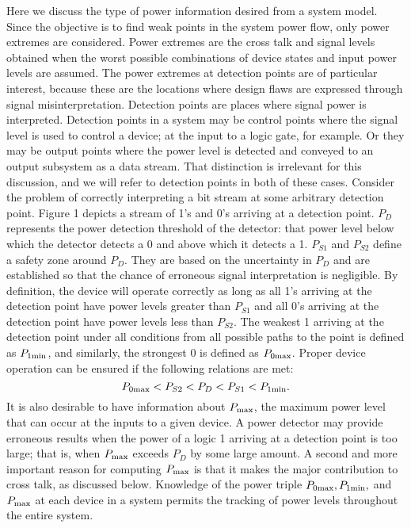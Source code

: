 Here we discuss the type of power information desired from a system model.
Since the objective is to find weak points in the system power flow, only
power extremes are considered.  Power extremes are the cross talk and
signal levels obtained when the worst possible combinations of device
states and input power levels are assumed.  The power extremes at detection
points are of particular interest, because these are the locations where
design flaws are expressed through signal misinterpretation.  Detection
points are places where signal power is interpreted.  Detection points in a
system may be control points where the signal level is used to control a
device; at the input to a logic gate, for example.  Or they may be output
points where the power level is detected and conveyed to an output
subsystem as a data stream.  That distinction is irrelevant for this
discussion, and we will refer to detection points in both of these cases.
Consider the problem of correctly interpreting a bit stream at some
arbitrary detection point.  Figure 1 depicts a stream of 1's and 0's
arriving at a detection point.  $ P_D $ represents the power detection
threshold of the detector: that power level below which the detector
detects a 0 and above which it detects a 1.  $ P_{S1} $ and $ P_{S2} $
define a safety zone around $ P_D$.  They are based on the uncertainty in $
P_D$ and are established so that the chance of erroneous signal
interpretation is negligible.  By definition, the device will operate
correctly as long as all 1's arriving at the detection point have power
levels greater than $ P_{S1}$ and all 0's arriving at the detection point
have power levels less than $ P_{S2}$.  The weakest 1 arriving at the
detection point under all conditions from all possible paths to the point
is defined as $P_{1\rm min}$, and similarly, the strongest 0 is defined as
$ P_{0\rm max}$.  Proper device operation can be ensured if the following
relations are met:
\begin{equation} P_{0\rm max} < P_{S2} < P_{D} < P_{S1} < P_{1\rm
min}.\label{p0}
\end{equation}
It is also desirable to have information about $ P_{\rm max} $, the maximum
power level that can occur at the inputs to a given device.  A power
detector may provide erroneous results when the power of a logic 1 arriving
at a detection point is too large; that is, when $ P_{\rm max} $ exceeds $
P_D $ by some large amount.  A second and more important reason for
computing $ P_{\rm max} $ is that it makes the major contribution to cross
talk, as discussed below.  Knowledge of the power triple $ P_{0\rm max},
P_{1\rm min}, $ and $ P_{\rm max} $ at each device in a system permits the
tracking of power levels throughout the entire system.


